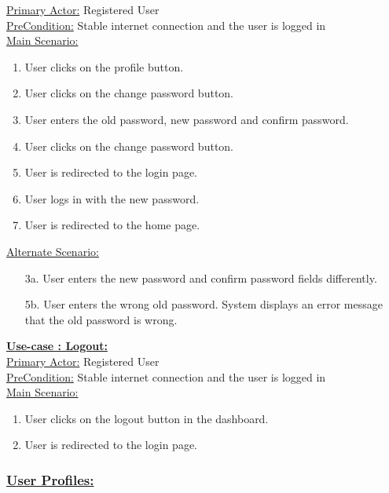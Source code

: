 \documentclass[conference,compsoc]{IEEEtran}
\newcounter{UC}
\newcommand{\nextU}{\stepcounter{UC}\theUC}
\begin{document}
\underline{Primary Actor:} Registered User\\

\underline{PreCondition:} Stable internet connection and the user is logged in\\

\underline{Main Scenario:}\\
\begin{enumerate}
    \item User clicks on the profile button.
    \item User clicks on the change password button.
    \item User enters the old password, new password and confirm password.
    \item User clicks on the change password button.
    \item User is redirected to the login page.
    \item User logs in with the new password.
    \item User is redirected to the home page.
\end{enumerate}

\underline{Alternate Scenario:}\\
\begin{enumerate}
    \item [3a.] User enters the new password and confirm password fields differently.
    \item [5b.] User enters the wrong old password. System displays an error message that the old password is wrong.
\end{enumerate}\vspace{0.2cm}

\underline{\textbf{Use-case \nextU: Logout:}}\\

\underline{Primary Actor:} Registered User\\

\underline{PreCondition:} Stable internet connection and the user is logged in\\

\underline{Main Scenario:}\\

\begin{enumerate}
    \item User clicks on the logout button in the dashboard.
    \item User is redirected to the login page.
\end{enumerate}

\subsubsection{\underline{User Profiles:}}
\vspace{0.2cm}
\end{document}
